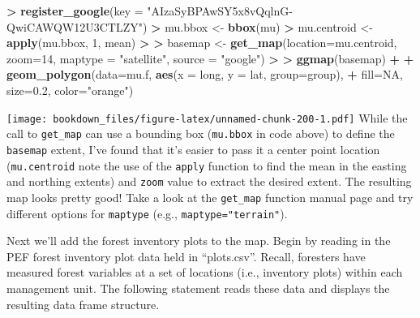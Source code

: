 \documentclass[]{krantz}
\makeatletter
\newenvironment{Shaded}{\begin{snugshade}}{\end{snugshade}}
\newcommand{\KeywordTok}[1]{\textcolor[rgb]{0.27,0.27,0.27}{\textbf{#1}}}
\newcommand{\DataTypeTok}[1]{\textcolor[rgb]{0.27,0.27,0.27}{#1}}
\newcommand{\DecValTok}[1]{\textcolor[rgb]{0.06,0.06,0.06}{#1}}
\newcommand{\FloatTok}[1]{\textcolor[rgb]{0.06,0.06,0.06}{#1}}
\newcommand{\StringTok}[1]{\textcolor[rgb]{0.5,0.5,0.5}{#1}}
\newcommand{\OtherTok}[1]{\textcolor[rgb]{0.37,0.37,0.37}{#1}}
\newcommand{\OperatorTok}[1]{\textcolor[rgb]{0.43,0.43,0.43}{\textbf{#1}}}
\newcommand{\ErrorTok}[1]{\textcolor[rgb]{0.14,0.14,0.14}{\textbf{#1}}}
\newcommand{\NormalTok}[1]{#1}
\newenvironment{kframe}{%
\medskip{}
\setlength{\fboxsep}{.8em}
 \def\at@end@of@kframe{}%
 \ifinner\ifhmode%
  \def\at@end@of@kframe{\end{minipage}}%
  \begin{minipage}{\columnwidth}%
 \fi\fi%
 \def\FrameCommand##1{\hskip\@totalleftmargin \hskip-\fboxsep
 \colorbox{shadecolor}{##1}\hskip-\fboxsep
     \hskip-\linewidth \hskip-\@totalleftmargin \hskip\columnwidth}%
 \MakeFramed {\advance\hsize-\width
   \@totalleftmargin\z@ \linewidth\hsize
   \@setminipage}}%
 {\par\unskip\endMakeFramed%
 \at@end@of@kframe}
\renewenvironment{Shaded}{\begin{kframe}}{\end{kframe}}
\makeatother
\begin{document}
\begin{Shaded}
\begin{Highlighting}[]
\OperatorTok{>}\StringTok{ }\KeywordTok{register_google}\NormalTok{(}\DataTypeTok{key =} \StringTok{"AIzaSyBPAwSY5x8vQqlnG-QwiCAWQW12U3CTLZY"}\NormalTok{)}
\OperatorTok{>}\StringTok{ }\NormalTok{mu.bbox <-}\StringTok{ }\KeywordTok{bbox}\NormalTok{(mu)}
\OperatorTok{>}\StringTok{ }\NormalTok{mu.centroid <-}\StringTok{ }\KeywordTok{apply}\NormalTok{(mu.bbox, }\DecValTok{1}\NormalTok{, mean)}
\OperatorTok{>}\StringTok{ }
\ErrorTok{>}\StringTok{ }\NormalTok{basemap <-}\StringTok{ }\KeywordTok{get_map}\NormalTok{(}\DataTypeTok{location=}\NormalTok{mu.centroid, }\DataTypeTok{zoom=}\DecValTok{14}\NormalTok{, }\DataTypeTok{maptype =} \StringTok{"satellite"}\NormalTok{, }\DataTypeTok{source =} \StringTok{"google"}\NormalTok{)}
\OperatorTok{>}\StringTok{                                     }
\ErrorTok{>}\StringTok{ }\KeywordTok{ggmap}\NormalTok{(basemap) }\OperatorTok{+}\StringTok{ }
\OperatorTok{+}\StringTok{   }\KeywordTok{geom_polygon}\NormalTok{(}\DataTypeTok{data=}\NormalTok{mu.f, }\KeywordTok{aes}\NormalTok{(}\DataTypeTok{x =}\NormalTok{ long, }\DataTypeTok{y =}\NormalTok{ lat, }\DataTypeTok{group=}\NormalTok{group), }
\OperatorTok{+}\StringTok{                  }\DataTypeTok{fill=}\OtherTok{NA}\NormalTok{, }\DataTypeTok{size=}\FloatTok{0.2}\NormalTok{, }\DataTypeTok{color=}\StringTok{"orange"}\NormalTok{)}
\end{Highlighting}
\end{Shaded}

\texttt{[image: bookdown\_files/figure-latex/unnamed-chunk-200-1.pdf]}
While the call to \texttt{get\_map} can use a bounding box
(\texttt{mu.bbox} in code above) to define the \texttt{basemap} extent,
I've found that it's easier to pass it a center point location
(\texttt{mu.centroid} note the use of the \texttt{apply} function to
find the mean in the easting and northing extents) and \texttt{zoom}
value to extract the desired extent. The resulting map looks pretty
good! Take a look at the \texttt{get\_map} function manual page and try
different options for \texttt{maptype} (e.g.,
\texttt{maptype="terrain"}).

Next we'll add the forest inventory plots to the map. Begin by reading
in the PEF forest inventory plot data held in ``plots.csv''. Recall,
foresters have measured forest variables at a set of locations (i.e.,
inventory plots) within each management unit. The following statement
reads these data and displays the resulting data frame structure.
\end{document}
